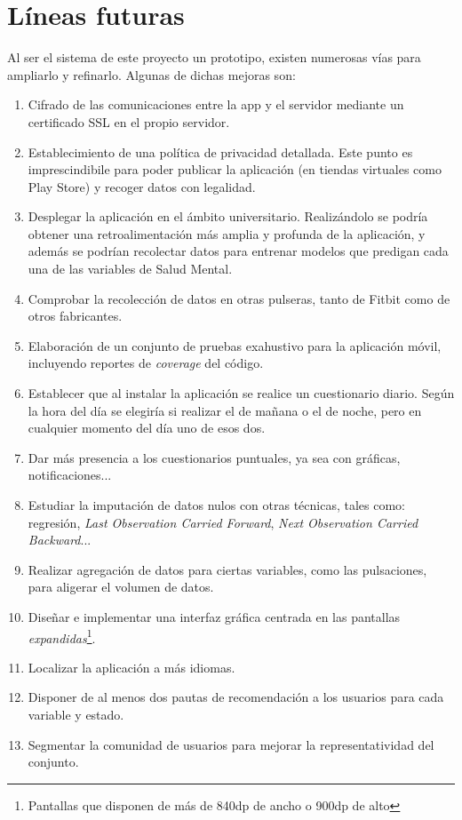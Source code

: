 \chapter{Líneas futuras}
\label{chapter:lineas}



Al ser el sistema de este proyecto un prototipo, existen numerosas vías para ampliarlo y refinarlo. Algunas de dichas
mejoras son:

\begin{enumerate}
    \item Cifrado de las comunicaciones entre la app y el servidor mediante un certificado SSL en el propio servidor.
    \item Establecimiento de una política de privacidad detallada. Este punto es imprescindibile para poder publicar la
    aplicación (en tiendas virtuales como Play Store) y recoger datos con legalidad.
    \item Desplegar la aplicación en el ámbito universitario. Realizándolo se podría obtener una retroalimentación más
    amplia y profunda de la aplicación, y además se podrían recolectar datos para entrenar
    modelos que predigan cada una de las variables de Salud Mental.
    \item Comprobar la recolección de datos en otras pulseras, tanto de Fitbit como de otros fabricantes.
    \item Elaboración de un conjunto de pruebas exahustivo para la aplicación móvil, incluyendo reportes de 
    \textit{coverage} del código.
    \item Establecer que al instalar la aplicación se realice un cuestionario diario. Según la hora del día se elegiría
    si realizar el de mañana o el de noche, pero en cualquier momento del día uno de esos dos.
    \item Dar más presencia a los cuestionarios puntuales, ya sea con gráficas, notificaciones...
    \item Estudiar la imputación de datos nulos con otras técnicas, tales como: regresión, \textit{Last Observation 
    Carried Forward}, \textit{Next Observation Carried Backward}... \cite{gupta_null_nodate}
    \item Realizar agregación de datos para ciertas variables, como las pulsaciones, para aligerar el volumen de datos.
    \item Diseñar e implementar una interfaz gráfica centrada en las pantallas \textit{expandidas}\footnote{Pantallas 
    que disponen de más de 840dp de ancho o 900dp de alto}.
    \item Localizar la aplicación a más idiomas.
    \item Disponer de al menos dos pautas de recomendación a los usuarios para cada variable y estado.
    \item Segmentar la comunidad de usuarios para mejorar la representatividad del conjunto.
\end{enumerate}

